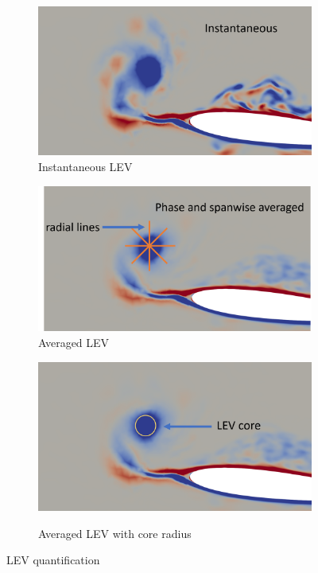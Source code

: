 \begin{figure}[H]
	\begin{subfigure}{0.5\textwidth}
		\includegraphics[width=1\textwidth]{figures/adapt_strat/LEV_tracking1.png}
		\caption{Instantaneous LEV}
		\label{fig:LEV_tracking1}
	\end{subfigure}
	\begin{subfigure}{0.51\textwidth}
	\includegraphics[width=1\textwidth]{figures/adapt_strat/LEV_tracking2.png}
	\caption{Averaged LEV}
	\label{fig:LEV_tracking2}
	\end{subfigure}

	\centering
	\begin{subfigure}{0.5\textwidth}
	\includegraphics[width=1\textwidth]{figures/adapt_strat/LEV_tracking3.png}
	\label{fig:LEV_tracking3}
    \caption{Averaged LEV with core radius}
\end{subfigure}
	
	\caption{LEV quantification}
	\label{fig:LEV_tracking}
\end{figure}


